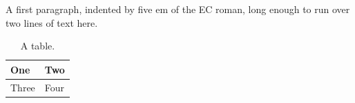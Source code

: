 \documentclass{article}
\begin{document}
A first paragraph, indented by five em of the EC roman, long enough to run over two lines of text here.

\begin{table}[h]
\centering
\begin{tabular}{ll}
\toprule
One & Two \\
\midrule
Three & Four \\
\bottomrule
\end{tabular}
\caption{A table.}
\end{table}
\end{document}
